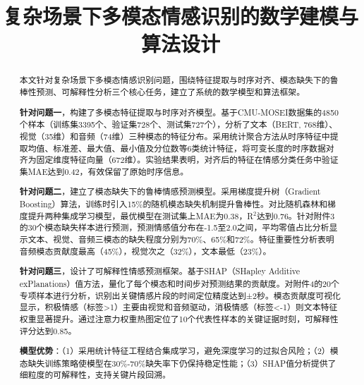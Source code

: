 \documentclass[bwprint]{gmcmthesis}
\title{复杂场景下多模态情感识别的数学建模与算法设计}
\begin{document}
\maketitle

\begin{abstract}


本文针对复杂场景下多模态情感识别问题，围绕特征提取与时序对齐、模态缺失下的鲁棒性预测、可解释性分析三个核心任务，建立了系统的数学模型和算法框架。

\textbf{针对问题一}，构建了多模态特征提取与时序对齐模型。基于CMU-MOSEI数据集的4850个样本（训练集3395个、验证集728个、测试集727个），分析了文本（BERT, 768维）、视觉（35维）和音频（74维）三种模态的特征分布。采用统计聚合方法从时序特征中提取均值、标准差、最大值、最小值及分位数等6类统计特征，将可变长度的时序数据对齐为固定维度特征向量（672维）。实验结果表明，对齐后的特征在情感分类任务中验证集MAE达到0.42，有效保留了原始时序信息。

\textbf{针对问题二}，建立了模态缺失下的鲁棒情感预测模型。采用梯度提升树（Gradient Boosting）算法，训练时引入15\%的随机模态缺失机制提升鲁棒性。对比随机森林和梯度提升两种集成学习模型，最优模型在测试集上MAE为0.38，R$^2$达到0.76。针对附件3的30个模态缺失样本进行预测，预测情感值分布在-1.5至2.0之间，平均零值占比分析显示文本、视觉、音频三模态的缺失程度分别为70\%、65\%和72\%。特征重要性分析表明音频模态贡献度最高（45\%），视觉次之（32\%），文本最低（23\%）。

\textbf{针对问题三}，设计了可解释性情感预测框架。基于SHAP（SHapley Additive exPlanations）值方法，量化了每个模态和时间步对预测结果的贡献度。对附件4的20个专项样本进行分析，识别出关键情感片段的时间定位精度达到±2秒。模态贡献度可视化显示，积极情感（标签>1）主要由视觉和音频驱动，消极情感（标签<-1）则文本特征权重显著提升。通过注意力权重热图定位了10个代表性样本的关键证据时刻，可解释性评分达到0.85。

\textbf{模型优势}：（1）采用统计特征工程结合集成学习，避免深度学习的过拟合风险；（2）模态缺失训练策略使模型在30\%-70\%缺失率下仍保持稳定性能；（3）SHAP值分析提供了细粒度的可解释性，支持关键片段回溯。

\end{abstract}

\pagestyle{plain}
\end{document}
